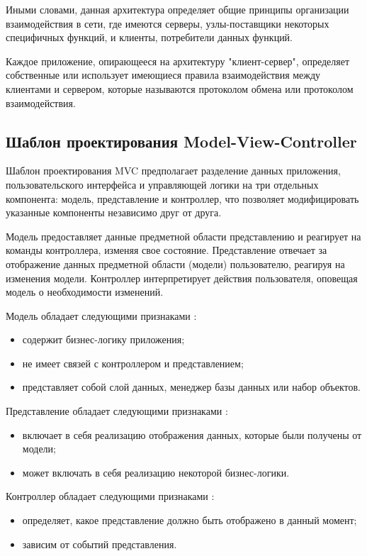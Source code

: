 Иными словами, данная архитектура определяет общие принципы организации взаимодействия в сети, где имеются серверы, узлы-поставщики некоторых специфичных функций, и клиенты, потребители данных функций.

Каждое приложение, опирающееся на архитектуру "клиент-сервер", определяет собственные или использует имеющиеся правила взаимодействия между клиентами и сервером, которые называются протоколом обмена или протоколом взаимодействия. \cite{clientServerProt}

\subsection{Шаблон проектирования Model-View-Controller}
Шаблон проектирования MVC предполагает разделение данных приложения, пользовательского интерфейса и управляющей логики на три отдельных компонента: модель, представление и контроллер, что позволяет модифицировать указанные компоненты независимо друг от друга. \cite{mvcInfo}

Модель предоставляет данные предметной области представлению и реагирует на команды контроллера, изменяя свое состояние. Представление отвечает за отображение данных предметной области (модели) пользователю, реагируя на изменения модели. Контроллер интерпретирует действия пользователя, оповещая модель о необходимости изменений. \cite{mvcInfo}

Модель обладает следующими признаками \cite{mvcHabr}:
\begin{itemize}[leftmargin=1.6\parindent]
\item содержит бизнес-логику приложения;
\item не имеет связей с контроллером и представлением;
\item представляет собой слой данных, менеджер базы данных или набор объектов.
\end{itemize}

Представление обладает следующими признаками \cite{mvcHabr}:
\begin{itemize}[leftmargin=1.6\parindent]
\item включает в себя реализацию отображения данных, которые были получены от модели;
\item может включать в себя реализацию некоторой бизнес-логики.
\end{itemize}

Контроллер обладает следующими признаками \cite{mvcHabr}:
\begin{itemize}[leftmargin=1.6\parindent]
\item определяет, какое представление должно быть отображено в данный момент;
\item зависим от событий представления.
\end{itemize}

